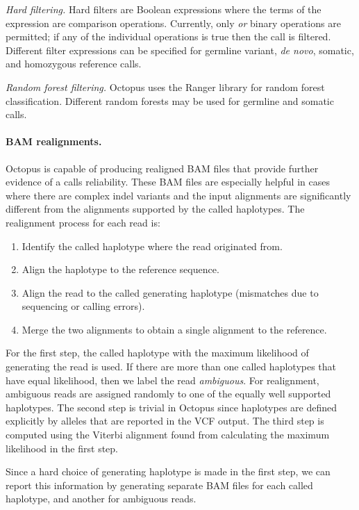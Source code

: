 \documentclass[notitlepage, twocolumn, 10pt]{article}
\begin{document}
\vspace{3mm}
\noindent\emph{Hard filtering.} Hard filters are Boolean expressions where the terms of the expression are comparison operations. Currently, only \emph{or} binary operations are permitted; if any of the individual operations is true then the call is filtered. Different filter expressions can be specified for germline variant, \textit{de novo}, somatic, and homozygous reference calls.

\vspace{3mm}
\noindent\emph{Random forest filtering.} Octopus uses the Ranger library \cite{RN564} for random forest classification. Different random forests may be used for germline and somatic calls.

\paragraph*{BAM realignments.} Octopus is capable of producing realigned BAM files that provide further evidence of a calls reliability. These BAM files are especially helpful in cases where there are complex indel variants and the input alignments are significantly different from the alignments supported by the called haplotypes. The realignment process for each read is:

\begin{enumerate}
	\item Identify the called haplotype where the read originated from.
	\item Align the haplotype to the reference sequence.
	\item Align the read to the called generating haplotype (mismatches due to sequencing or calling errors).
	\item Merge the two alignments to obtain a single alignment to the reference.
\end{enumerate}

For the first step, the called haplotype with the maximum likelihood of generating the read is used. If there are more than one called haplotypes that have equal likelihood, then we label the read \emph{ambiguous}. For realignment, ambiguous reads are assigned randomly to one of the equally well supported haplotypes. The second step is trivial in Octopus since haplotypes are defined explicitly by alleles that are reported in the VCF output. The third step is computed using the Viterbi alignment found from calculating the maximum likelihood in the first step.

Since a hard choice of generating haplotype is made in the first step, we can report this information by generating separate BAM files for each called haplotype, and another for ambiguous reads.
\end{document}
